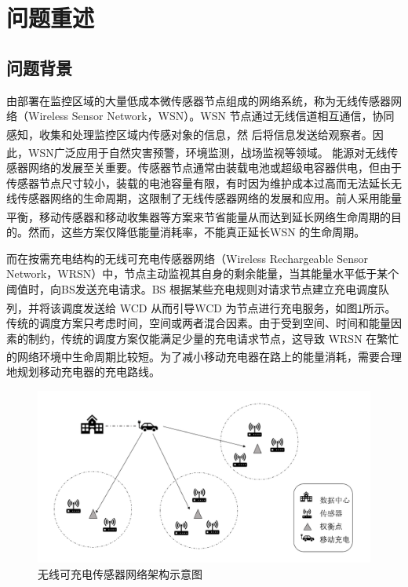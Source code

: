 \documentclass{whutmod}
\newcommand{\upcite}[1]{\textsuperscript{\cite{#1}}}
\begin{document}
	\thispagestyle{empty}
	\tableofcontents
	\setcounter{page}{0}                                               
	\newpage	%
	

	
	\section{问题重述}	
		\subsection{问题背景}
	    	由部署在监控区域的大量低成本微传感器节点组成的网络系统，称为无线传感器网络（Wireless Sensor Network，WSN）。WSN 节点通过无线信道相互通信，协同感知，收集和处理监控区域内传感对象的信息，然
	    	后将信息发送给观察者\upcite{1}。因此，WSN广泛应用于自然灾害预警，环境监测，战场监视等领域\upcite{2}。
	    	能源对无线传感器网络的发展至关重要。传感器节点通常由装载电池或超级电容器供电，但由于传感器节点尺寸较小，装载的电池容量有限，有时因为维护成本过高而无法延长无线传感器网络的生命周期，这限制了无线传感器网络的发展和应用。前人采用能量平衡\upcite{4,5}，移动传感器\upcite{6,7}和移动收集器等方案来节省能量从而达到延长网络生命周期的目的。然而，这些方案仅降低能量消耗率，不能真正延长WSN 的生命周期。

	    	
	    	而在按需充电结构的无线可充电传感器网络（Wireless Rechargeable Sensor Network，WRSN）中，节点主动监视其自身的剩余能量，当其能量水平低于某个阈值时，向BS发送充电请求。BS 根据某些充电规则对请求节点建立充电调度队列，并将该调度发送给 WCD 从而引导WCD 为节点进行充电服务\upcite{3}，如图\ref{lasbel}所示。传统的调度方案只考虑时间，空间或两者混合因素。由于受到空间、时间和能量因素的制约，传统的调度方案仅能满足少量的充电请求节点，这导致 WRSN 在繁忙的网络环境中生命周期比较短\upcite{3}。为了减小移动充电器在路上的能量消耗，需要合理地规划移动充电器的充电路线。
				\begin{figure}[H]
		\centering
		\includegraphics[width=\textwidth]{figures/demo.png}
		\caption{无线可充电传感器网络架构示意图}\label{lasbel}
	\end{figure}
	
\end{document}
